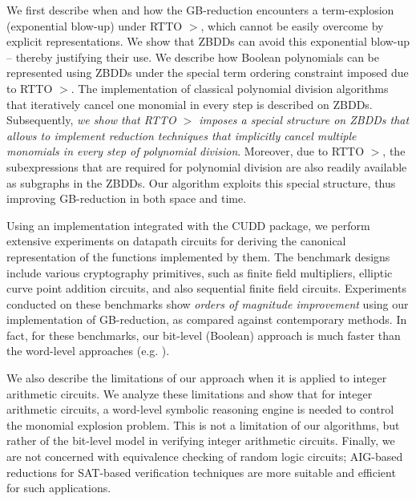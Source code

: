 
We first describe when and how the GB-reduction encounters a
term-explosion (exponential blow-up) under RTTO $>$, which cannot be
easily overcome by explicit representations. We show that ZBDDs can
avoid this exponential blow-up -- thereby justifying their use. We
describe how Boolean polynomials can be represented using ZBDDs under
the special term ordering constraint imposed due to RTTO $>$. The
implementation of classical polynomial division algorithms that
iteratively cancel one monomial in every step is described on ZBDDs.
Subsequently, {\it we show that RTTO $>$ imposes 
a special structure on ZBDDs that allows to implement reduction
techniques that implicitly cancel multiple   monomials in every step
of polynomial division}. Moreover, due to RTTO $>$,  the
subexpressions that are required for polynomial division are also
readily available as subgraphs in the ZBDDs. Our algorithm exploits
this special structure, thus improving GB-reduction in both space and
time. 

Using an implementation integrated with the CUDD \cite{cudd} package,
we perform extensive experiments on datapath circuits for deriving the
canonical representation of the functions implemented by them. The
benchmark designs include various cryptography primitives, such as
finite field multipliers, elliptic curve point addition circuits, and
also  sequential finite field circuits. Experiments conducted on these
benchmarks show {\it orders of magnitude improvement} using our
implementation of GB-reduction, as compared against contemporary
methods. In fact, for these benchmarks, our bit-level (Boolean)
approach is much faster than the word-level approaches
(e.g. \cite{pruss:tcad}). 

We also describe the limitations of our approach when it is
applied to integer arithmetic circuits. We analyze these limitations
and show that for integer arithmetic circuits, a word-level symbolic
reasoning engine is needed to control the monomial explosion
problem. This is not a limitation of our 
algorithms, but rather of the bit-level model in verifying integer
arithmetic circuits. Finally, we are not concerned with equivalence
checking of random logic circuits; AIG-based reductions for
SAT-based verification techniques \cite{alanmi:cec:iccad2006} are more
suitable and efficient for such applications. 



